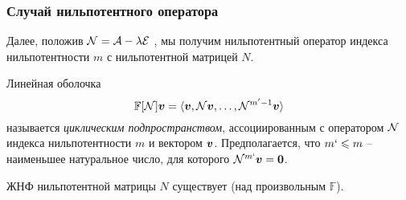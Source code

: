 \subsubsection{Случай нильпотентного оператора}

Далее, положив $\N = \A - \lambda \mathcal E$ , мы получим нильпотентный оператор индекса нильпотентности $m$ с нильпотентной матрицей $N$.

\begin{to_def} 
    Линейная оболочка 
$$
    \mathbb{F}[\N] \vc{v} = \langle \vc{v}, \N \vc{v}, \ldots, \N^{m'-1} \vc{v}\rangle
$$
называется \textit{циклическим подпространством}, ассоциированным с оператором $\N$ индекса нильпотентности $m$ и вектором $\vc{v}$. Предполагается, что $m` \leq m$ -- наименьшее натуральное число, для которого $\N^{m`} \vc{v} = \vc{0}$.
\end{to_def}

\begin{to_thr} 
    ЖНФ нильпотентной матрицы $N$ существует (над произвольным $\mathbb{F}$).
\end{to_thr}

